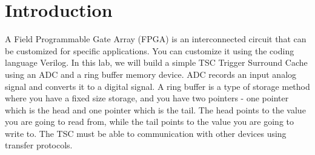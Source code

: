\section{Introduction}
A Field Programmable Gate Array (FPGA) is an interconnected circuit that can be customized
for specific applications. You can customize it using the coding language Verilog.
In this lab, we will build a simple TSC Trigger Surround Cache using an ADC and a ring buffer memory device.
ADC records an input analog signal and converts it to a digital signal.
A ring buffer is a type of storage method where you have a fixed size storage, and you have two pointers
- one pointer which is the head and one pointer which is the tail.
The head points to the value you are going to read from, while the tail points to
the value you are going to write to.
The TSC must be able to communication with other devices using transfer protocols.
